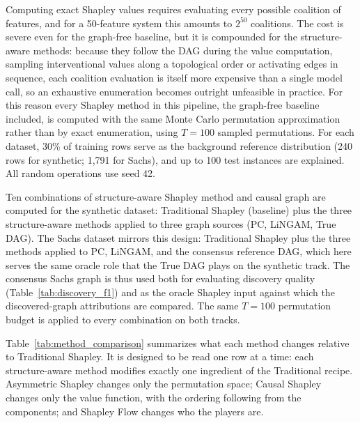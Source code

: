 \documentclass[12pt,a4paper,oneside]{article}
\begin{document}
Computing exact Shapley values requires evaluating every possible coalition of features, and for a 50-feature system this amounts to $2^{50}$ coalitions. The cost is severe even for the graph-free baseline, but it is compounded for the structure-aware methods: because they follow the DAG during the value computation, sampling interventional values along a topological order or activating edges in sequence, each coalition evaluation is itself more expensive than a single model call, so an exhaustive enumeration becomes outright unfeasible in practice. For this reason every Shapley method in this pipeline, the graph-free baseline included, is computed with the same Monte Carlo permutation approximation rather than by exact enumeration, using $T = 100$ sampled permutations. For each dataset, 30\% of training rows serve as the background reference distribution (240 rows for synthetic; 1,791 for Sachs), and up to 100 test instances are explained. All random operations use seed 42.

Ten combinations of structure-aware Shapley method and causal graph are computed for the synthetic dataset: Traditional Shapley (baseline) plus the three structure-aware methods applied to three graph sources (PC, LiNGAM, True DAG). The Sachs dataset mirrors this design: Traditional Shapley plus the three methods applied to PC, LiNGAM, and the consensus reference DAG, which here serves the same oracle role that the True DAG plays on the synthetic track. The consensus Sachs graph is thus used both for evaluating discovery quality (Table~\ref{tab:discovery_f1}) and as the oracle Shapley input against which the discovered-graph attributions are compared. The same $T = 100$ permutation budget is applied to every combination on both tracks.

Table~\ref{tab:method_comparison} summarizes what each method changes relative to Traditional Shapley. It is designed to be read one row at a time: each structure-aware method modifies exactly one ingredient of the Traditional recipe. Asymmetric Shapley changes only the permutation space; Causal Shapley changes only the value function, with the ordering following from the components; and Shapley Flow changes who the players are.
\end{document}
